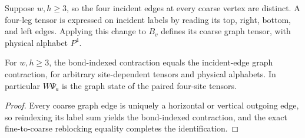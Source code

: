 \begin{definition}%
    \label{def:peps_two_by_two_graph_site}
    \leanok
    Suppose $w,h\geq3$, so the four incident edges at every coarse vertex
    are distinct. A four-leg tensor is expressed on incident labels by
    reading its top, right, bottom, and left edges. Applying this change
    to $B_v$ defines its coarse graph tensor, with physical alphabet $P^4$.
\end{definition}

\begin{lemma}%
    \label{thm:peps_two_by_two_graph_contraction}
    \leanok
    For $w,h\geq3$, the bond-indexed contraction equals the incident-edge
    graph contraction, for arbitrary site-dependent tensors and physical
    alphabets. In particular $W\Psi_a$ is the graph state of the
    paired four-site tensors.
\end{lemma}

\begin{proof}\leanok
    Every coarse graph edge is uniquely a horizontal or vertical outgoing
    edge, so reindexing its label sum yields the bond-indexed contraction,
    and the exact fine-to-coarse reblocking equality completes the
    identification.
\end{proof}
